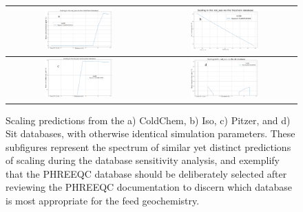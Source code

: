 \begin{figure}[h]
    \centering
    \begin{tabular}{c|c}
        \includegraphics[width=0.49\textwidth]{images/ROSSpy/sensitivity_analyses/databases/ColdChem.png} 
        & \includegraphics[width=0.49\textwidth]{images/ROSSpy/sensitivity_analyses/databases/FreezChem.png} \\ \midrule 
        \includegraphics[width=0.49\textwidth]{images/ROSSpy/sensitivity_analyses/databases/Pitzer.png} 
        & \includegraphics[width=0.49\textwidth]{images/ROSSpy/sensitivity_analyses/databases/Sit.png} 
        \\ \bottomrule
    \end{tabular}
    \caption{
        Scaling predictions from the a) ColdChem, b) Iso, c) Pitzer, and d) Sit databases, with otherwise identical simulation parameters. These subfigures represent the spectrum of similar yet distinct predictions of scaling during the database sensitivity analysis, and exemplify that the PHREEQC database should be deliberately selected after reviewing the PHREEQC documentation to discern which database is most appropriate for the feed geochemistry.
    }
    \label{database_selection}
\end{figure}

